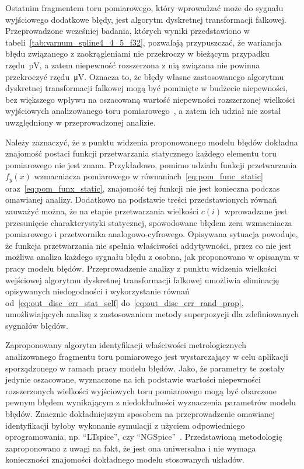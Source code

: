 Ostatnim fragmentem toru pomiarowego, który wprowadzać może do sygnału wyjściowego dodatkowe błędy, jest algorytm dyskretnej transformacji falkowej. Przeprowadzone wcześniej badania, których wyniki przedstawiono w tabeli~\ref{tab:varnum_spline4_4_5_f32}, pozwalają przypuszczać, że wariancja błędu związanego z zaokrągleniami nie przekroczy w bieżącym przypadku rzędu~\unit{\pico V}, a zatem niepewność rozszerzona z nią związana nie powinna przekroczyć rzędu~\unit{\micro V}. Oznacza to, że błędy własne zastosowanego algorytmu dyskretnej transformacji falkowej mogą być pominięte w budżecie niepewności, bez większego wpływu na oszacowaną wartość niepewności rozszerzonej wielkości wyjściowych analizowanego toru pomiarowego~\cite{jcgm_guide}, a zatem ich udział nie został uwzględniony w przeprowadzonej analizie.

Należy zaznaczyć, że z punktu widzenia proponowanego modelu błędów dokładna znajomość postaci funkcji przetwarzania statycznego każdego elementu toru pomiarowego nie jest znana. Przykładowo, pomimo udziału funkcji przetwarzania $f_{y}(x)$ wzmacniacza pomiarowego w równaniach~\eqref{eq:pom_func_static} oraz~\eqref{eq:pom_funx_static}, znajomość tej funkcji nie jest konieczna podczas omawianej analizy. Dodatkowo na podstawie treści przedstawionych równań zauważyć można, że na etapie przetwarzania wielkości $c(i)$ wprowadzane jest przesunięcie charakterystyki statycznej, spowodowane błędem zera wzmacniacza pomiarowego i przetwornika analogowo-cyfrowego. Opisywana sytuacja powoduje, że funkcja przetwarzania nie spełnia właściwości addytywności, przez co nie jest możliwa analiza każdego sygnału błędu z osobna, jak proponowano w opisanym w pracy modelu błędów. Przeprowadzenie analizy z punktu widzenia wielkości wejściowej algorytmu dyskretnej transformacji falkowej umożliwia eliminację opisywanych niedogodności i wykorzystanie równań od~\eqref{eq:out_disc_err_stat_self} do~\eqref{eq:out_disc_err_rand_prop}, umożliwiających analizę z zastosowaniem metody superpozycji dla zdefiniowanych sygnałów błędów.

Zaproponowany algorytm identyfikacji właściwości metrologicznych analizowanego fragmentu toru pomiarowego jest wystarczający w celu aplikacji sporządzonego w ramach pracy modelu błędów. Jako, że parametry te zostały jedynie oszacowane, wyznaczone na ich podstawie wartości niepewności rozszerzonych wielkości wyjściowych toru pomiarowego mogą być obarczone pewnym błędem wynikającym z niedokładności wyznaczenia parametrów modelu błędów. Znacznie dokładniejszym sposobem na przeprowadzenie omawianej identyfikacji byłoby wykonanie symulacji z użyciem odpowiedniego oprogramowania, np. \enquote{LTspice}, czy \enquote{NGSpice}~\cite{mikkelsen_ltspice, nenzi_ngspice}. Przedstawioną metodologię zaproponowano z uwagi na fakt, że jest ona uniwersalna i nie wymaga konieczności znajomości dokładnego modelu stosowanych układów.

